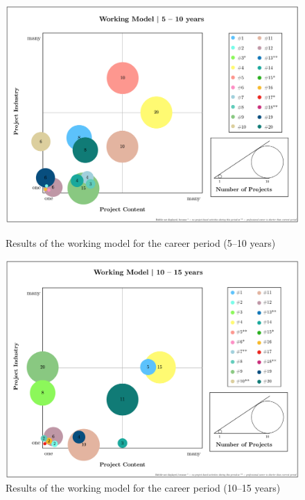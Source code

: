 \begin{figure}[!hbt]
  \includegraphics[width=\linewidth]{figures/WM_0510.png}
  \caption[Results of the working model: 5–10 years]{Results of the working model for the  career period (5–10 years)}
  \label{fig:WM_0510}
\endminipage\hfill
{}
  \includegraphics[width=\linewidth]{figures/WM_1015.png}
  \caption[Results of the working model: 10–15 years]{Results of the working model for the  career period (10–15 years)}
  \label{fig:WM_1015}
  \endminipage

\vspace*{.6cm}


\end{figure}
